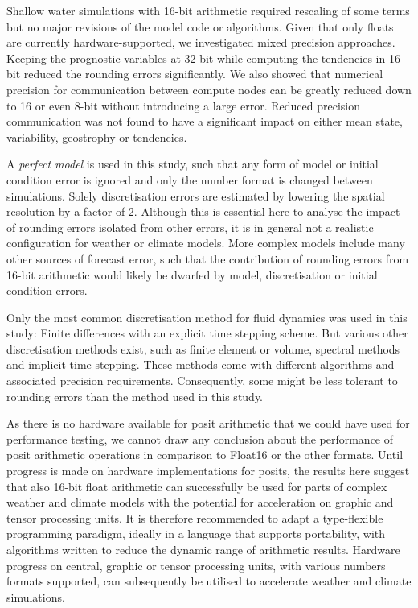 \documentclass[draft]{agujournal2019}
\begin{document}
Shallow water simulations with 16-bit arithmetic required rescaling of some terms
but no major revisions of the model code or algorithms. Given that only floats are
currently hardware-supported, we investigated mixed precision approaches.
Keeping the prognostic variables at 32 bit while computing the tendencies in 16 bit
reduced the rounding errors significantly. We also showed that numerical precision
for communication between compute nodes can be greatly reduced down to 16 or
even 8-bit without introducing a large error. Reduced precision communication was
not found to have a significant impact on either mean state, variability,
geostrophy or tendencies.

A \emph{perfect model} is used in this study, such that any form
of model or initial condition error is ignored and only the number format is
changed between simulations. Solely discretisation errors are estimated by
lowering the spatial resolution by a factor of 2. Although this is essential
here to analyse the impact of rounding errors isolated from other errors, it
is in general not a realistic configuration for weather or climate models. More
complex models include many other sources of forecast error, such that the
contribution of rounding errors from 16-bit arithmetic would likely be dwarfed by
model, discretisation or initial condition errors.

Only the most common discretisation method for fluid dynamics was used in
this study: Finite differences with an explicit time stepping scheme. But various
other discretisation methods exist, such as finite element or volume, spectral
methods and implicit time stepping. These methods come with different algorithms
and associated precision requirements. Consequently, some might be
less tolerant to rounding errors than the method used in this study.

As there is no hardware available for posit arithmetic that we could have used
for performance testing, we cannot draw any conclusion about the performance of
posit arithmetic operations in comparison to Float16 or the other formats.
Until progress is made on hardware implementations for posits, the results here
suggest that also 16-bit float arithmetic can successfully be used for parts of
complex weather and climate models with the potential for acceleration on graphic
and tensor processing units. It is therefore recommended to adapt a type-flexible
programming paradigm, ideally in a language that supports portability, with
algorithms written to reduce the dynamic range of arithmetic results. Hardware
progress on central, graphic or tensor processing units, with various numbers
formats supported, can subsequently be utilised to accelerate weather and
climate simulations.
\end{document}
